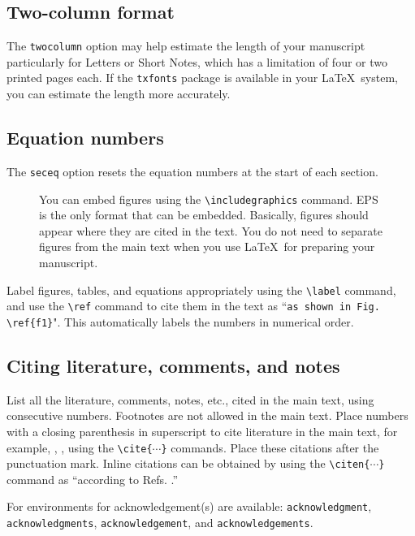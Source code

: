 \documentclass{jpsj3}
\begin{document}
\subsection{Two-column format}

The \verb|twocolumn| option may help estimate the length of your manuscript particularly for Letters or Short Notes, which has a limitation of four or two printed pages each. If the \verb|txfonts| package is available in your \LaTeX\ system, you can estimate the length more accurately.

\subsection{Equation numbers}

The \verb|seceq| option resets the equation numbers at the start of each section.


\begin{figure}
\caption{You can embed figures using the \texttt{\textbackslash includegraphics} command. EPS is the only format that can be embedded. Basically, figures should appear where they are cited in the text. You do not need to separate figures from the main text when you use \LaTeX\ for preparing your manuscript.}
\label{f1}
\end{figure}

Label figures, tables, and equations appropriately using the \verb|\label| command, and use the \verb|\ref| command to cite them in the text as ``\verb|as shown in Fig. \ref{f1}|". This automatically labels the numbers in numerical order.

\subsection{Citing literature, comments, and notes}

List all the literature, comments, notes, etc., cited in the main text, using consecutive numbers.  Footnotes are not allowed in the main text.  Place numbers with a closing parenthesis in superscript to cite literature in the main text, for example, \cite{jpsj} \cite{instructions,etal}, \cite{jpsj,instructions,etal,ibid,Errata}, using the \verb|\cite{|$\cdots$\verb|}| commands. Place these citations after the punctuation mark.  Inline citations can be obtained by using the \verb|\citen{|$\cdots$\verb|}| command as ``according to Refs. .''

\begin{acknowledgment}


For environments for acknowledgement(s) are available: \verb|acknowledgment|, \verb|acknowledgments|, \verb|acknowledgement|, and \verb|acknowledgements|.

\end{acknowledgment}
\end{document}
